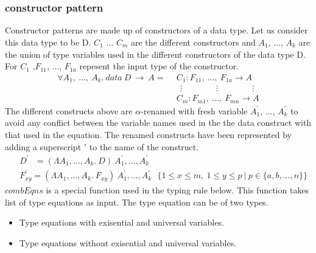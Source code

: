 \documentclass[11pt]{article}
\begin{document}
~~\\~~\\
\subsubsection {constructor pattern}
Constructor patterns are made up of constructors of a data type. Let us consider this data type to be D. $C_1$ $\ldots$ $C_m$ are the different constructors and $A_1$, $\ldots$, $A_k$ are the union of type variables used in the different constructors of the data type D. For $C_1$ ,$F_{11}$, $\ldots$, $F_{1a}$ repesent the input type of the constructor.
\begin{align*} 
\forall A_1,~ \ldots,~A_k.~data~ D ~\to~ A =
 & ~~ C_1 : F_{11},~ \ldots, ~ F_{1a} \to A \\
 & ~~~~ \vdots \qquad\qquad \vdots \qquad\qquad \vdots \\ 
 & ~~ C_m : F_{m1} ,~ \ldots, ~ F_{mn} \to A
\end{align*}
The different constructs above are $\alpha$-renamed with fresh variable $A_1^{\prime}$, $\ldots$, $A_k^{\prime}$ to avoid any conflict between the variable names used in the the data construct with that used in the equation. The renamed constructs have been represented by adding a superscript $\prime$ to the name of the construct.
\begin{align*}
 & ~~ D^\prime ~~~ = (\Lambda A_1,\ldots,A_k.~ D)~A_1^{\prime},\ldots,A_k^{\prime}\\ 
 & ~~ F_{xy}^\prime = (\Lambda A_1,\ldots,A_k.~F_{xy})~A_1^{\prime},\ldots,A_k^{\prime} 
 ~~~  \{1 \leq x \leq m,~1 \leq y \leq p ~|~ p \in \{a,b,\ldots,n\} \} 
 \end{align*}
$combEqns$ is a special function used in the typing rule below. This function takes list of type equations as input. The type equation can be of two types.
\begin {itemize}
  \item Type equations with exisential and universal variables.
  \item Type equations without exisential and universal variables.
\end {itemize}
\end{document}
